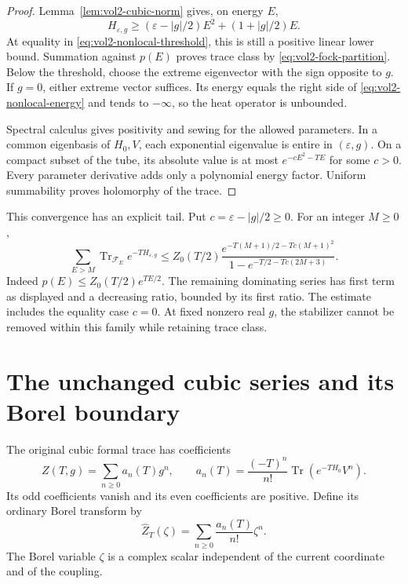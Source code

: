 \begin{proof}
Lemma~\ref{lem:vol2-cubic-norm} gives, on energy \(E\),
\begin{equation}\label{eq:vol2-nonlocal-energy}
 H_{\varepsilon,g}\geq
 (\varepsilon-|g|/2)E^2+(1+|g|/2)E.
\end{equation}
At equality in \eqref{eq:vol2-nonlocal-threshold}, this is still
a positive linear lower bound. Summation against \(p(E)\) proves
trace class by \eqref{eq:vol2-fock-partition}. Below the threshold,
choose the extreme eigenvector with the sign opposite to \(g\).
If \(g=0\), either extreme vector suffices. Its energy equals the
right side of \eqref{eq:vol2-nonlocal-energy} and tends to
\(-\infty\), so the heat operator is unbounded.

Spectral calculus gives positivity and sewing for the allowed
parameters. In a common eigenbasis of \(H_0,V\), each exponential
eigenvalue is entire in \((\varepsilon,g)\). On a compact subset
of the tube, its absolute value is at most
\(e^{-cE^2-TE}\) for some \(c>0\). Every parameter derivative
adds only a polynomial energy factor. Uniform summability proves
holomorphy of the trace.
\end{proof}

This convergence has an explicit tail. Put
\(c=\varepsilon-|g|/2\geq0\). For an integer \(M\geq0\),
\begin{equation}\label{eq:vol2-stabilized-tail}
 \sum_{E>M}\operatorname{Tr}_{\mathcal F_E}e^{-TH_{\varepsilon,g}}
 \leq Z_0(T/2)
 \frac{e^{-T(M+1)/2-Tc(M+1)^2}}
      {1-e^{-T/2-Tc(2M+3)}}.
\end{equation}
Indeed \(p(E)\leq Z_0(T/2)e^{TE/2}\). The remaining dominating
series has first term as displayed and a decreasing ratio, bounded
by its first ratio. The estimate includes the equality case \(c=0\).
At fixed nonzero real \(g\), the stabilizer cannot be removed
within this family while retaining trace class.

\section{The unchanged cubic series and its Borel boundary}

The original cubic formal trace has coefficients
\begin{equation}\label{eq:vol2-cubic-formal-trace}
 Z(T,g)=\sum_{n\geq0}a_n(T)g^n,
 \qquad
 a_n(T)=\frac{(-T)^n}{n!}\operatorname{Tr}(e^{-TH_0}V^n).
\end{equation}
Its odd coefficients vanish and its even coefficients are positive.
Define its ordinary Borel transform by
\[
 \widehat Z_T(\zeta)=\sum_{n\geq0}\frac{a_n(T)}{n!}\zeta^n.
\]
The Borel variable \(\zeta\) is a complex scalar independent of
the current coordinate and of the coupling.

